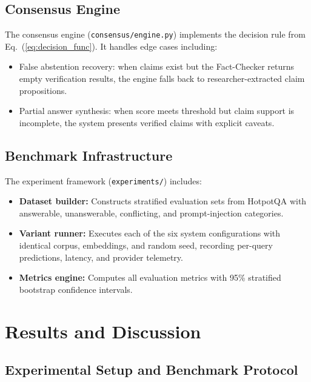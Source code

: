 \documentclass[conference]{IEEEtran}
\begin{document}
\subsection{Consensus Engine}
The consensus engine (\texttt{consensus/engine.py}) implements the decision rule
from Eq.~(\ref{eq:decision_func}). It handles edge cases including:
\begin{itemize}
  \item False abstention recovery: when claims exist but the Fact-Checker returns
    empty verification results, the engine falls back to researcher-extracted
    claim propositions.
  \item Partial answer synthesis: when score meets threshold but claim support is
    incomplete, the system presents verified claims with explicit caveats.
\end{itemize}

\subsection{Benchmark Infrastructure}
The experiment framework (\texttt{experiments/}) includes:
\begin{itemize}
  \item \textbf{Dataset builder:} Constructs stratified evaluation sets from
    HotpotQA with answerable, unanswerable, conflicting, and prompt-injection categories.
  \item \textbf{Variant runner:} Executes each of the six system configurations
    with identical corpus, embeddings, and random seed, recording per-query
    predictions, latency, and provider telemetry.
  \item \textbf{Metrics engine:} Computes all evaluation metrics with 95\%
    stratified bootstrap confidence intervals.
\end{itemize}

\section{Results and Discussion}
\label{sec:results}

\subsection{Experimental Setup and Benchmark Protocol}
\label{sec:setup}
\end{document}

